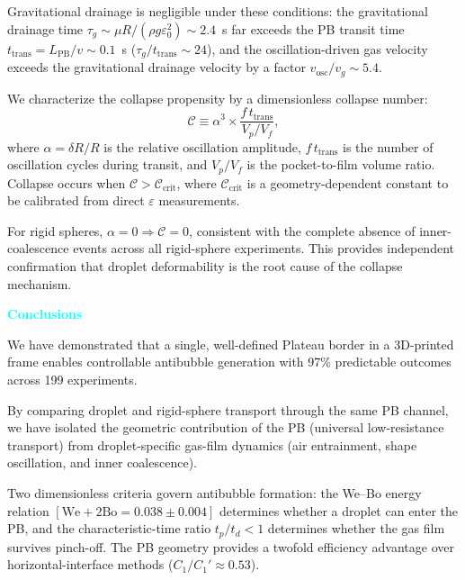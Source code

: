 \documentclass[%
 preprint,
 superscriptaddress,
 amsmath,amssymb,
 aps, prl,
]{revtex4-2}
\begin{document}
Gravitational drainage is negligible under these conditions: the gravitational drainage time $\tau_g \sim \mu R/(\rho g \varepsilon_0^2) \sim 2.4$~s far exceeds the PB transit time $t_{\text{trans}} = L_{\text{PB}}/v \sim 0.1$~s ($\tau_g/t_{\text{trans}} \sim 24$), and the oscillation-driven gas velocity exceeds the gravitational drainage velocity by a factor $v_{\text{osc}}/v_g \sim 5.4$.\par

We characterize the collapse propensity by a dimensionless collapse number:
\begin{equation}
\mathcal{C} \equiv \alpha^3 \times \frac{f\,t_{\text{trans}}}{V_p/V_f},
\label{eq:collapse}
\end{equation}
where $\alpha = \delta R/R$ is the relative oscillation amplitude, $f\,t_{\text{trans}}$ is the number of oscillation cycles during transit, and $V_p/V_f$ is the pocket-to-film volume ratio. Collapse occurs when $\mathcal{C} > \mathcal{C}_{\text{crit}}$, where $\mathcal{C}_{\text{crit}}$ is a geometry-dependent constant to be calibrated from direct $\varepsilon$ measurements.\par

For rigid spheres, $\alpha = 0 \Rightarrow \mathcal{C} = 0$, consistent with the complete absence of inner-coalescence events across all rigid-sphere experiments. This provides independent confirmation that droplet deformability is the root cause of the collapse mechanism.\par

\textcolor{cyan}{\textbf{Conclusions}}\par

We have demonstrated that a single, well-defined Plateau border in a 3D-printed frame enables controllable antibubble generation with 97\% predictable outcomes across 199 experiments.\par

By comparing droplet and rigid-sphere transport through the same PB channel, we have isolated the geometric contribution of the PB (universal low-resistance transport) from droplet-specific gas-film dynamics (air entrainment, shape oscillation, and inner coalescence).\par

Two dimensionless criteria govern antibubble formation: the We--Bo energy relation $[\text{We} + 2\text{Bo} = 0.038 \pm 0.004]$ determines whether a droplet can enter the PB, and the characteristic-time ratio $t_p/t_d < 1$ determines whether the gas film survives pinch-off. The PB geometry provides a twofold efficiency advantage over horizontal-interface methods ($C_1/C_1' \approx 0.53$).\par
\end{document}
